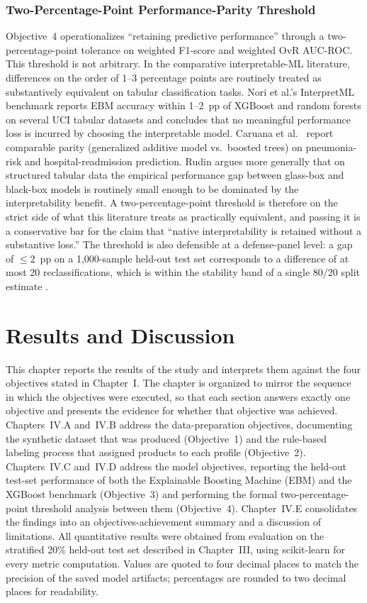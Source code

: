 \documentclass[journal]{./IEEE/IEEEtran}
\begin{document}
\subsubsection{Two-Percentage-Point Performance-Parity Threshold}

Objective~4 operationalizes ``retaining predictive performance'' through a two-percentage-point tolerance on weighted F1-score and weighted OvR AUC-ROC. This threshold is not arbitrary. In the comparative interpretable-ML literature, differences on the order of 1--3 percentage points are routinely treated as substantively equivalent on tabular classification tasks. Nori et al.'s \cite{ref15} InterpretML benchmark reports EBM accuracy within 1--2~pp of XGBoost and random forests on several UCI tabular datasets and concludes that no meaningful performance loss is incurred by choosing the interpretable model. Caruana et al.\ \cite{ref50} report comparable parity (generalized additive model vs.\ boosted trees) on pneumonia-risk and hospital-readmission prediction. Rudin \cite{ref51} argues more generally that on structured tabular data the empirical performance gap between glass-box and black-box models is routinely small enough to be dominated by the interpretability benefit. A two-percentage-point threshold is therefore on the strict side of what this literature treats as practically equivalent, and passing it is a conservative bar for the claim that ``native interpretability is retained without a substantive loss.'' The threshold is also defensible at a defense-panel level: a gap of $\leq 2$~pp on a 1{,}000-sample held-out test set corresponds to a difference of at most 20 reclassifications, which is within the stability band of a single 80/20 split estimate \cite{ref68}.

\section{Results and Discussion}

This chapter reports the results of the study and interprets them against the four objectives stated in Chapter~I. The chapter is organized to mirror the sequence in which the objectives were executed, so that each section answers exactly one objective and presents the evidence for whether that objective was achieved. Chapters~IV.A and~IV.B address the data-preparation objectives, documenting the synthetic dataset that was produced (Objective~1) and the rule-based labeling process that assigned products to each profile (Objective~2). Chapters~IV.C and~IV.D address the model objectives, reporting the held-out test-set performance of both the Explainable Boosting Machine (EBM) and the XGBoost benchmark (Objective~3) and performing the formal two-percentage-point threshold analysis between them (Objective~4). Chapter~IV.E consolidates the findings into an objectives-achievement summary and a discussion of limitations. All quantitative results were obtained from evaluation on the stratified 20\% held-out test set described in Chapter~III, using scikit-learn \cite{ref74} for every metric computation. Values are quoted to four decimal places to match the precision of the saved model artifacts; percentages are rounded to two decimal places for readability.
\end{document}
